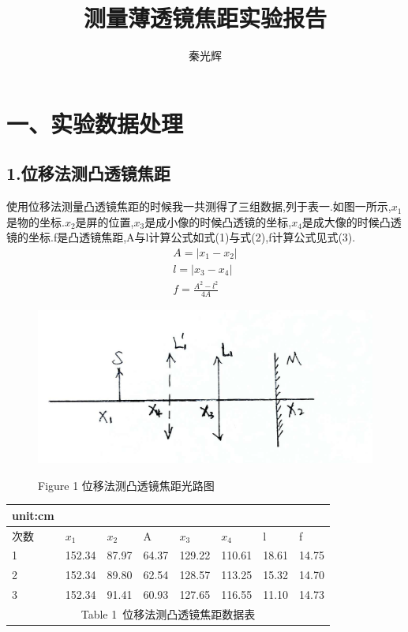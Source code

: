 \documentclass[a4paper,10pt,notitlepage]{report}
\begin{document}
\title{测量薄透镜焦距实验报告}
\author{秦光辉}
\maketitle

\section*{一、实验数据处理}
\subsection*{1.位移法测凸透镜焦距}

	使用位移法测量凸透镜焦距的时候我一共测得了三组数据,列于表一.如图一所示,$x_1$是物的坐标.$x_2$是屏的位置,$x_3$是成小像的时候凸透镜的坐标,$x_4$是成大像的时候凸透镜的坐标.f是凸透镜焦距,A与l计算公式如式(1)与式(2),f计算公式见式(3).\\
	
\begin{align}
	A=| x_1 - x_2 | \\
	l=| x_3 - x_4 | \\
	f=\frac{A^2 - l^2}{4A} 
\end{align}
	
\begin{figure}[htbp]
\centering

	\includegraphics[bb=0 0 1280 587,scale=.15]{wyt.jpg}
	\begin{center}
		\scriptsize Figure 1 位移法测凸透镜焦距光路图
	\end{center}

\end{figure}
	
\begin{table}[htbp]
\centering
	\begin{tabular}{|l|l|l|l|l|l|l|l|}
	
		\multicolumn{1}{l}{\scriptsize unit:cm} \\
		\hline
		次数 & $x_1$ & $x_2$ & A & $x_3$ & $x_4$ & l & f \\
		\hline
		1 & 152.34 & 87.97 & 64.37 & 129.22 & 110.61 & 18.61 & 14.75 \\
		\hline
		2 & 152.34 & 89.80 & 62.54 & 128.57 & 113.25 & 15.32 & 14.70 \\
		\hline
		3 & 152.34 & 91.41 & 60.93 & 127.65 & 116.55 & 11.10 & 14.73 \\
		\hline
		\multicolumn{8}{c}{\scriptsize Table 1\ 位移法测凸透镜焦距数据表} \\

	\end{tabular}
\end{table}
\end{document}
